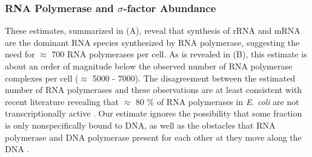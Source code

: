 \begin{figure}
    \begin{fullwidth}
    \end{fullwidth}
\end{figure}


\subsubsection{RNA Polymerase and $\sigma$-factor Abundance}
These estimates, summarized in  (A), reveal that synthesis of
rRNA  and mRNA are the dominant RNA species synthesized by RNA polymerase,
suggesting the need for $\approx$ 700 RNA polymerases per cell. As is revealed
in  (B), this estimate is about an order of magnitude below
the observed number of RNA polymerase complexes per cell ($\approx$ 5000 -
7000). The disagreement between the estimated number of RNA polymerases and
these observations are at least consistent with recent literature revealing that
$\approx$ 80 \% of RNA polymerases in \textit{E. coli} are not transcriptionally
active \citep{patrick2015}. Our estimate ignores the possibility that some
fraction is only nonspecifically bound to DNA, as well as the obstacles that RNA
polymerase and DNA polymerase present for each other at they move along the DNA
\citep{finkelstein2013}.


